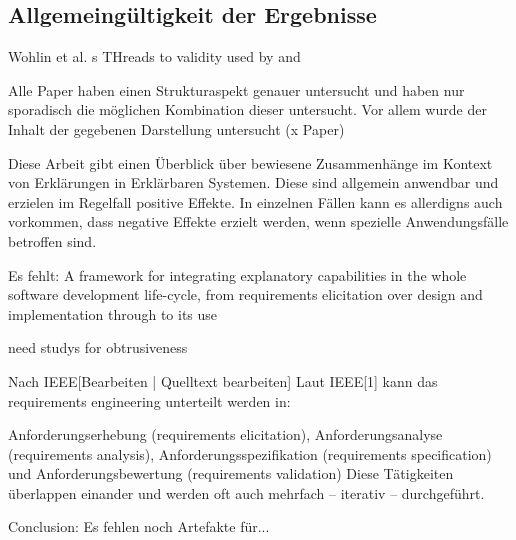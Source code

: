 \subsection{Allgemeingültigkeit der Ergebnisse}

Wohlin et al. s THreads to validity \cite{wohlin2012experimentation} used by \cite{ghazi2016exploratory} and \cite{carvalho2020developers}

Alle Paper haben einen Strukturaspekt genauer untersucht und haben nur sporadisch die möglichen Kombination dieser untersucht. Vor allem wurde der Inhalt der gegebenen Darstellung untersucht (x Paper)

Diese Arbeit gibt einen Überblick über bewiesene Zusammenhänge im Kontext von Erklärungen in Erklärbaren Systemen. Diese sind allgemein anwendbar und erzielen im Regelfall positive Effekte. In einzelnen Fällen kann es allerdigns auch vorkommen, dass negative Effekte erzielt werden, wenn spezielle Anwendungsfälle betroffen sind.

Es fehlt: A framework for integrating explanatory capabilities in the whole software development life-cycle, from requirements elicitation over design and implementation through to its use \cite{cassens_ambient_2019}

need studys for obtrusiveness \cite{lim_2009_assessing}

Nach IEEE[Bearbeiten | Quelltext bearbeiten]
Laut IEEE[1] kann das requirements engineering unterteilt werden in:

Anforderungserhebung (requirements elicitation),
Anforderungsanalyse (requirements analysis),
Anforderungsspezifikation (requirements specification) und
Anforderungsbewertung (requirements validation)
Diese Tätigkeiten überlappen einander und werden oft auch mehrfach – iterativ – durchgeführt.

Conclusion: Es fehlen noch Artefakte für...